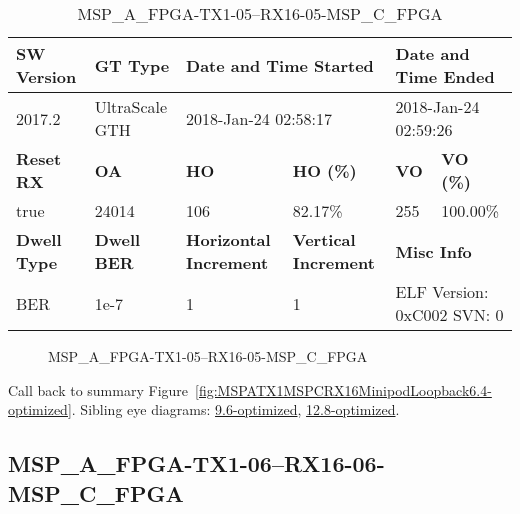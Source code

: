 \begin{table}[h]
\centering
\caption{MSP\_A\_FPGA-TX1-05--RX16-05-MSP\_C\_FPGA}
\label{tab:MSPAFPGATX105RX1605MSPCFPGA6.4-optimized}
\begin{tabular}{@{}|l|l|l|l|l|l|@{}}
\toprule
\textbf{SW Version}                & \textbf{GT Type}   & \multicolumn{2}{l|}{\textbf{Date and Time Started}}            & \multicolumn{2}{l|}{\textbf{Date and Time Ended}}        \\ \midrule
2017.2                       & UltraScale GTH          & \multicolumn{2}{l|}{2018-Jan-24 02:58:17}                   & \multicolumn{2}{l|}{2018-Jan-24 02:59:26}               \\ \midrule
\textbf{Reset RX}                  & \textbf{OA} & \textbf{HO}   & \textbf{HO (\%)} & \textbf{VO} & \textbf{VO (\%)} \\ \midrule
true & 24014        & 106          & 82.17\%        & 255        & 100.00\%       \\ \midrule
\textbf{Dwell Type}                & \textbf{Dwell BER} & \textbf{Horizontal Increment} & \textbf{Vertical Increment}    & \multicolumn{2}{l|}{\textbf{Misc Info}}                  \\ \midrule
BER                            & 1e-7        & 1        & 1           & \multicolumn{2}{l|}{ELF Version: 0xC002 SVN: 0}                         \\ \bottomrule
\end{tabular}
\end{table}

\begin{figure}[h]
\caption{MSP\_A\_FPGA-TX1-05--RX16-05-MSP\_C\_FPGA} \label{fig:MSPAFPGATX105RX1605MSPCFPGA6.4-optimized}
\end{figure}

Call back to summary Figure~\ref{fig:MSPATX1MSPCRX16MinipodLoopback6.4-optimized}.
Sibling eye diagrams: \hyperref[sec:MSPAFPGATX105RX1605MSPCFPGA9.6-optimized]{9.6-optimized}, \hyperref[sec:MSPAFPGATX105RX1605MSPCFPGA12.8-optimized]{12.8-optimized}.

\clearpage
\newpage


\subsection{MSP\_A\_FPGA-TX1-06--RX16-06-MSP\_C\_FPGA}\label{sec:MSPAFPGATX106RX1606MSPCFPGA6.4-optimized}

